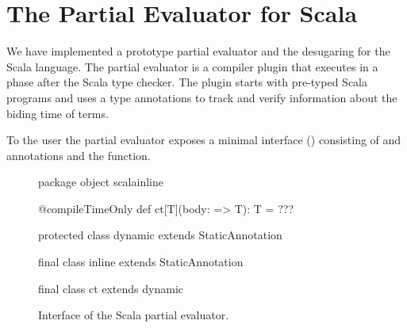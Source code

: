 \section{The Partial Evaluator for Scala}
\label{sct:interface}

We have implemented a prototype partial evaluator  and
 the desugaring  for the Scala language. The partial evaluator
 is a compiler plugin that executes in a phase after the Scala type checker. The plugin starts
 with pre-typed Scala programs and uses a type annotations  to track and verify
 information about the biding time of terms.

To the user the partial evaluator exposes a minimal interface () consisting of
 and  annotations and the  function.

\begin{figure}
\begin{listing}
package object scalainline {
  @compileTimeOnly def ct[T](body: => T): T = ???

  protected class dynamic extends StaticAnnotation

  final class inline extends StaticAnnotation

  final class ct extends dynamic
}
\end{listing}
\label{fig:interface}
\caption{Interface of the Scala partial evaluator.}
\end{figure}
